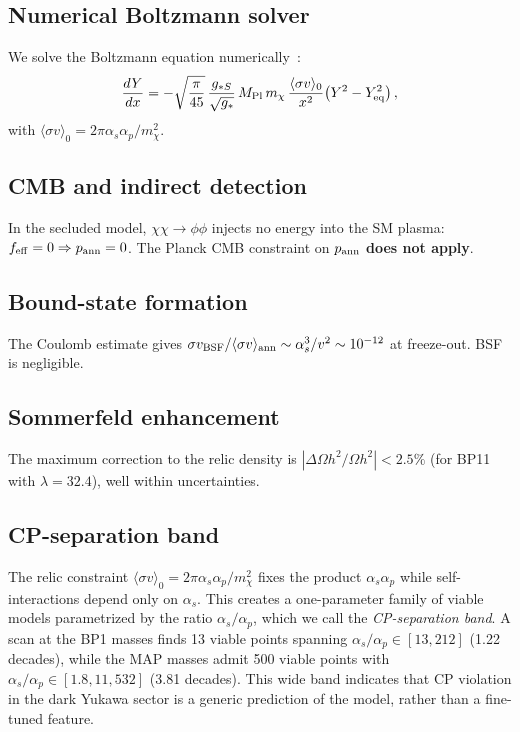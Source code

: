 \documentclass[aps,prd,twocolumn,superscriptaddress,nofootinbib]{revtex4-2}
\newcommand{\mchi}{m_\chi}
\newcommand{\OmH}{\Omega h^2}
\newcommand{\lam}{\lambda}
\begin{document}
\subsection{Numerical Boltzmann solver}\label{sec:boltzmann}

We solve the Boltzmann equation numerically~\cite{Gondolo:1990dk}:
\begin{equation}\label{eq:boltzmann}
  \frac{dY}{dx} = -\sqrt{\frac{\pi}{45}}\,
  \frac{g_{*S}}{\sqrt{g_*}}\,M_{\rm Pl}\,\mchi\,
  \frac{\langle\sigma v\rangle_0}{x^{2}}
  \bigl(Y^{2}-Y_{\rm eq}^{2}\bigr)\,,
\end{equation}
with $\langle\sigma v\rangle_0 = 2\pi\alpha_s\alpha_p/\mchi^{2}$.

\subsection{CMB and indirect detection}\label{sec:cmb}

In the secluded model, $\chi\chi\to\phi\phi$ injects no energy into
the SM plasma: $f_{\rm eff}=0 \Rightarrow p_{\rm ann}=0$.  The Planck
CMB constraint on $p_{\rm ann}$ \textbf{does not apply}.

\subsection{Bound-state formation}\label{sec:bsf}

The Coulomb estimate gives
$\sigma v_{\rm BSF}/\langle\sigma v\rangle_{\rm ann}
\sim\alpha_s^{3}/v^{2}\sim 10^{-12}$ at freeze-out.  BSF is negligible.

\subsection{Sommerfeld enhancement}\label{sec:sommerfeld}

The maximum correction to the relic density is
$|\Delta\OmH/\OmH|<2.5\%$ (for BP11 with $\lam=32.4$),
well within uncertainties.

\subsection{CP-separation band}\label{sec:cp_separation}

The relic constraint $\langle\sigma v\rangle_0 = 2\pi\alpha_s\alpha_p/\mchi^2$
fixes the product $\alpha_s\alpha_p$ while self-interactions depend only
on $\alpha_s$.  This creates a one-parameter family of viable models
parametrized by the ratio $\alpha_s/\alpha_p$, which we call the
\emph{CP-separation band}.  A scan at the BP1 masses finds 13 viable
points spanning $\alpha_s/\alpha_p\in[13,212]$ (1.22 decades),
while the MAP masses admit 500 viable points with
$\alpha_s/\alpha_p\in[1.8,11{,}532]$ (3.81 decades).  This wide
band indicates that CP violation in the dark Yukawa sector is a generic
prediction of the model, rather than a fine-tuned feature.
\end{document}

